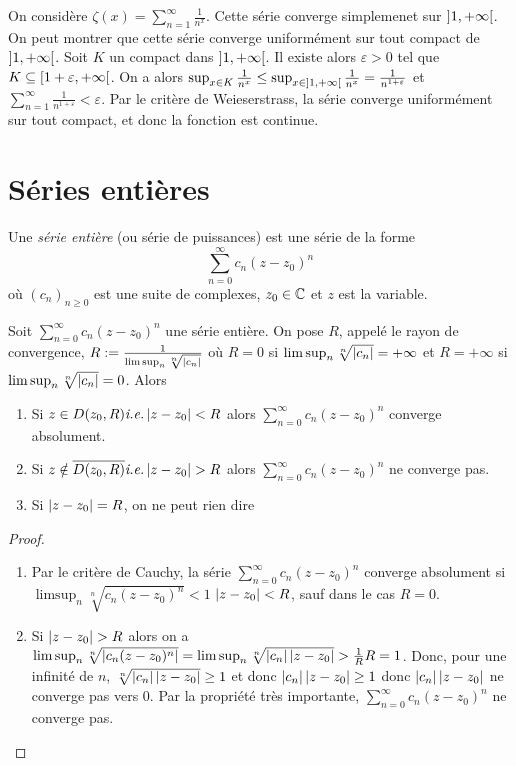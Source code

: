\begin{exemple}
On considère $\zeta(x) = \sum_{n=1}^\infty\frac1{n^x}$. Cette série converge simplemenet sur $\left] 1,+\infty\right[$. On peut montrer que cette série converge uniformément sur tout compact de $\left] 1,+\infty\right[$. Soit $K$ un compact dans $\left] 1,+\infty\right[$. Il existe alors $\varepsilon>0$ tel que $K\subseteq\left[ 1+\varepsilon,+\infty\right[$. On a alors $\sup_{x\in K}\frac{1}{n^x}\le\sup_{x\in \left] 1,+\infty\right[} \frac{1}{n^x} = \frac{1}{n^{1+\varepsilon}}$ et $\sum_{n=1}^\infty\frac{1}{n^{1+\varepsilon}}<\varepsilon$. Par le critère de Weieserstrass, la série converge uniformément sur tout compact, et donc la fonction est continue.
\end{exemple}
\section{Séries entières}
\begin{definition}
    Une \emph{série entière} (ou série de puissances) est une série de la forme $$\sum_{n=0}^\infty c_n(z-z_0)^n$$ où $(c_n)_{n\ge0}$ est une suite de complexes, $z_0\in\mathbb{C}$ et $z$ est la variable.
\end{definition}
\begin{proposition}
Soit $\sum_{n=0}^\infty c_n(z-z_0)^n$ une série entière. On pose $R$, appelé le rayon de convergence, $R:=\frac{1}{\limsup_n\sqrt[n]{\left| c_n \right|}}$ où $R = 0$ si $\limsup_n\sqrt[n]{\left| c_n \right|} = +\infty$ et $R=+\infty$ si $\limsup_n\sqrt[n]{\left| c_n \right|} = 0$. Alors \begin{enumerate}
        \item Si $z\in D(z_0,R) \textit{i.e.} \left| z-z_0 \right|<R$ alors $\sum_{n=0}^\infty c_n(z-z_0)^n$ converge absolument.
        \item  Si $z\notin \overline{D(z_0,R)} \ie \abs{z-z_0}>R$ alors $\sum_{n=0}^\infty c_n(z-z_0)^n$ ne converge pas.
        \item Si $\left| z-z_0 \right| = R$, on ne peut rien dire
    \end{enumerate}
\end{proposition}
\begin{proof}
\begin{enumerate}
    \item Par le critère de Cauchy, la série $\sum_{n=0}^\infty c_n(z-z_0)^n$ converge absolument si $\limsup_n\sqrt[n]{c_n(z-z_0)^n}<1$ \ie $\left| z-z_0 \right|<R$, sauf dans le cas $R=0$. 
    \item Si $\abs{z-z_0}>R$ alors on a $\limsup_{n}{\sqrt[n]{\left| c_n(z-z_0)^n \right|}} = \limsup_n\sqrt[n]{\left| c_n \right|\left| z-z_0 \right|}>\frac{1}{R}R = 1$. Donc, pour une infinité de $n$, $\sqrt[n]{\left| c_n \right|\left| z-z_0 \right|}\ge 1$ et donc ${\left| c_n \right|\left| z-z_0 \right|}\ge 1$ donc $\left| c_n \right|\left| z-z_0 \right|$ ne converge pas vers $0$. Par la propriété très importante, $\sum_{n=0}^\infty c_n(z-z_0)^n$ ne converge pas.
\end{enumerate}
\end{proof}
